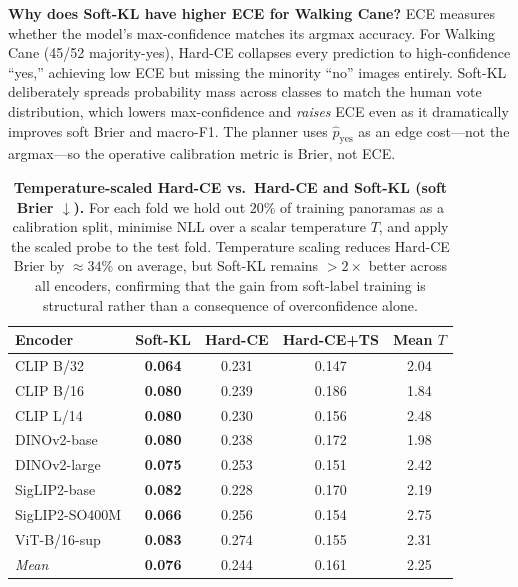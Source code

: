\documentclass{article}
\begin{document}
\noindent\textbf{Why does Soft-KL have higher ECE for Walking Cane?} ECE measures whether the model's max-confidence matches its argmax accuracy. For Walking Cane (45/52 majority-yes), Hard-CE collapses every prediction to high-confidence ``yes,'' achieving low ECE but missing the minority ``no'' images entirely. Soft-KL deliberately spreads probability mass across classes to match the human vote distribution, which lowers max-confidence and \emph{raises} ECE even as it dramatically improves soft Brier and macro-F1. The planner uses $\hat{p}_\mathrm{yes}$ as an edge cost---not the argmax---so the operative calibration metric is Brier, not ECE.

\begin{table}[!ht]
\caption{\textbf{Temperature-scaled Hard-CE vs.\ Hard-CE and Soft-KL (soft Brier $\downarrow$).}
  For each fold we hold out $20\%$ of training panoramas as a calibration split, minimise NLL over a scalar temperature $T$, and apply the scaled probe to the test fold. Temperature scaling reduces Hard-CE Brier by ${\approx}34\%$ on average, but Soft-KL remains $>2\times$ better across all encoders, confirming that the gain from soft-label training is structural rather than a consequence of overconfidence alone.}
\label{tab:temp_scaling}
\centering\scriptsize
\setlength{\tabcolsep}{5pt}
\begin{tabular}{@{}lcccc@{}}
\toprule
\textbf{Encoder} & \textbf{Soft-KL} & \textbf{Hard-CE} & \textbf{Hard-CE+TS} & \textbf{Mean $T$} \\
\midrule
CLIP B/32        & \textbf{0.064} & 0.231 & 0.147 & 2.04 \\
CLIP B/16        & \textbf{0.080} & 0.239 & 0.186 & 1.84 \\
CLIP L/14        & \textbf{0.080} & 0.230 & 0.156 & 2.48 \\
DINOv2-base      & \textbf{0.080} & 0.238 & 0.172 & 1.98 \\
DINOv2-large     & \textbf{0.075} & 0.253 & 0.151 & 2.42 \\
SigLIP2-base     & \textbf{0.082} & 0.228 & 0.170 & 2.19 \\
SigLIP2-SO400M   & \textbf{0.066} & 0.256 & 0.154 & 2.75 \\
ViT-B/16-sup     & \textbf{0.083} & 0.274 & 0.155 & 2.31 \\
\midrule
\textit{Mean}    & \textbf{0.076} & 0.244 & 0.161 & 2.25 \\
\bottomrule
\end{tabular}
\end{table}
\end{document}

